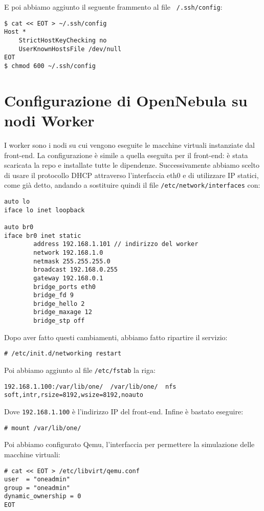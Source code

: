 \documentclass[twoside]{article}
\begin{document}
E poi abbiamo aggiunto il seguente frammento al file \texttt{~/.ssh/config}:
\begin{lstlisting}[frame=trBL]
$ cat << EOT > ~/.ssh/config
Host *
    StrictHostKeyChecking no
    UserKnownHostsFile /dev/null
EOT
$ chmod 600 ~/.ssh/config
\end{lstlisting}

\section{Configurazione di OpenNebula su nodi Worker}
I worker sono i nodi su cui vengono eseguite le macchine virtuali instanziate dal front-end.
La configurazione è simile a quella eseguita per il front-end: è stata scaricata la repo
e installate tutte le dipendenze. Successivamente abbiamo scelto di usare il protocollo DHCP
attraverso l'interfaccia eth0 e di utilizzare IP statici, come già detto, andando a sostituire
quindi il file \texttt{/etc/network/interfaces} con:
\begin{lstlisting}[frame=trBL]
auto lo
iface lo inet loopback

auto br0
iface br0 inet static
        address 192.168.1.101 // indirizzo del worker
        network 192.168.1.0
        netmask 255.255.255.0
        broadcast 192.168.0.255
        gateway 192.168.0.1
        bridge_ports eth0
        bridge_fd 9
        bridge_hello 2
        bridge_maxage 12
        bridge_stp off
\end{lstlisting}

Dopo aver fatto questi cambiamenti, abbiamo fatto ripartire il servizio:
\begin{lstlisting}[frame=trBL]
# /etc/init.d/networking restart
\end{lstlisting}

Poi abbiamo aggiunto al file \texttt{/etc/fstab} la riga:
\begin{lstlisting}[frame=trBL]
192.168.1.100:/var/lib/one/  /var/lib/one/  nfs   soft,intr,rsize=8192,wsize=8192,noauto
\end{lstlisting}

Dove \texttt{192.168.1.100} è l'indirizzo IP del front-end. Infine è bastato eseguire:
\begin{lstlisting}[frame=trBL]
# mount /var/lib/one/
\end{lstlisting}

Poi abbiamo configurato Qemu, l'interfaccia per permettere la simulazione delle macchine virtuali:
\begin{lstlisting}[frame=trBL]
# cat << EOT > /etc/libvirt/qemu.conf
user  = "oneadmin"
group = "oneadmin"
dynamic_ownership = 0
EOT
\end{lstlisting}
\end{document}
